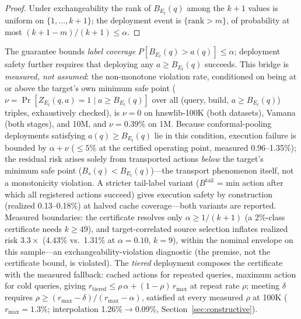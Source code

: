 \documentclass{article}
\renewcommand{\Pr}{\mathop{\mathrm{Pr}}}   %
\begin{document}
\begin{proof}
Under exchangeability the rank of $B_{E_t}(q)$ among the $k{+}1$ values is uniform on
$\{1,\dots,k{+}1\}$; the deployment event is $\{\mathrm{rank}>m\}$, of probability at most
$(k{+}1-m)/(k{+}1)\le\alpha$.
\end{proof}

The guarantee bounds \emph{label coverage} $P[B_{E_t}(q)>a(q)]\le\alpha$; deployment safety further
requires that deploying any $a\ge B_{E_t}(q)$ succeeds. This bridge is \emph{measured, not assumed}: the
non-monotone violation rate, conditioned on being at or above the target's own minimum safe point
($\nu=\Pr[Z_{E_t}(q,a){=}1 \mid a \ge B_{E_t}(q)]$ over all (query, build, $a \ge B_{E_t}(q)$)
triples, exhaustively checked), is $\nu=0$ on hnswlib-100K (both datasets), Vamana (both stages), and
10M, and $\nu=0.39\%$ on 1M. Because conformal-pooling deployments satisfying $a(q) \ge B_{E_t}(q)$
lie in this condition, execution failure is bounded by $\alpha+\nu$ ($\le 5\%$ at the certified
operating point, measured 0.96--1.35\%); the residual risk arises solely from transported actions
\emph{below} the target's minimum safe point ($B_s(q) < B_{E_t}(q)$)---the transport phenomenon
itself, not a monotonicity violation. A stricter tail-label variant ($B^{\mathrm{tail}}$ = min action after which all
registered actions succeed) gives execution safety by construction (realized 0.13--0.18\%) at halved
cache coverage---both variants are reported. Measured boundaries: the certificate resolves only
$\alpha\ge 1/(k+1)$ (a 2\%-class certificate needs $k\ge 49$), and target-correlated source selection
inflates realized risk $3.3\times$ (4.43\% vs.\ 1.31\% at $\alpha{=}0.10$, $k{=}9$), within the
nominal envelope on this sample---an exchangeability-violation diagnostic (the premise, not the certificate bound, is violated).
The \emph{tiered} deployment composes the certificate with the measured fallback: cached actions for
repeated queries, maximum action for cold queries, giving
$r_{\mathrm{tiered}}\le\rho\,\alpha+(1-\rho)\,r_{\max}$ at repeat rate $\rho$; meeting $\delta$
requires $\rho\ge(r_{\max}-\delta)/(r_{\max}-\alpha)$, satisfied at every measured $\rho$ at 100K
($r_{\max}{=}1.3\%$; interpolation 1.26\%$\to$0.09\%, Section~\ref{sec:constructive}).
\end{document}
